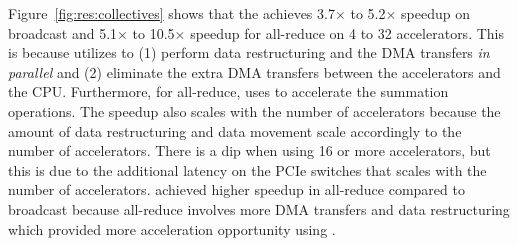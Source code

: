 Figure~\ref{fig:res:collectives} shows that the \dmx achieves 3.7$\times$ to 5.2$\times$ speedup on broadcast and 5.1$\times$ to 10.5$\times$ speedup for all-reduce on 4 to 32 accelerators.
%
This is because \dmx utilizes \drxs to (1) perform data restructuring and the DMA transfers \emph{in parallel} and (2) eliminate the extra DMA transfers between the accelerators and the CPU.
%
Furthermore, for all-reduce, \dmx uses \drx to accelerate the summation operations.
%
The speedup also scales with the number of accelerators because the amount of data restructuring and data movement scale accordingly to the number of accelerators. 
%
There is a dip when using 16 or more accelerators, but this is due to the additional latency on the PCIe switches that scales with the number of accelerators.
%
\dmx achieved higher speedup in all-reduce compared to broadcast because all-reduce involves more DMA transfers and data restructuring which provided more acceleration opportunity using \drx.
%
%
%
%
%
%
%
%
%
